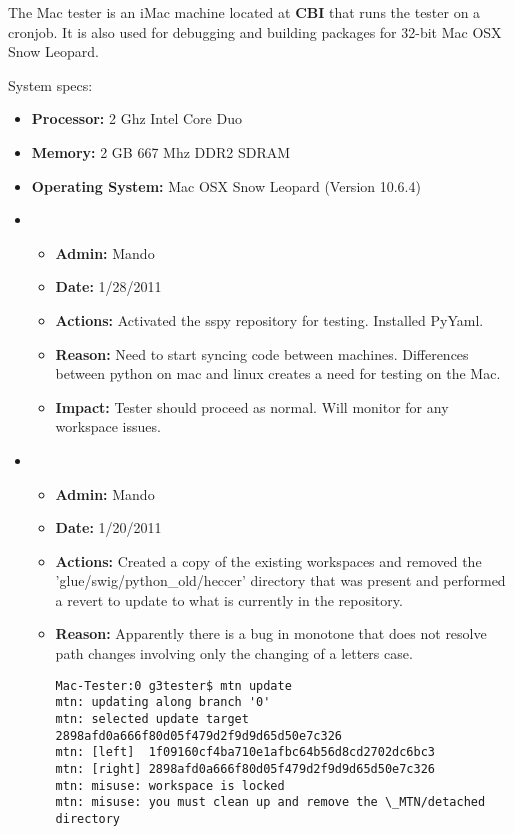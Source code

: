 \documentclass[12pt]{article}
\begin{document}
The Mac tester is an iMac machine located at {\bf CBI} that runs the tester on a cronjob. It is also used for debugging and building packages for 32-bit Mac OSX Snow Leopard.

System specs:
\begin{itemize}
\item[] {\bf Processor:} 2 Ghz Intel Core Duo
\item[] {\bf Memory:} 2 GB 667 Mhz DDR2 SDRAM
\item[] {\bf Operating System:} Mac OSX Snow Leopard (Version 10.6.4) 
\end{itemize}

\begin{itemize}



\item
\begin{itemize}
\item[] {\bf Admin:} Mando
\item[] {\bf Date:} 1/28/2011 
\item[] {\bf Actions:}  Activated the sspy repository for testing. Installed PyYaml.
\item[] {\bf Reason:} Need to start syncing code between machines. Differences between python on mac and linux creates a need for testing on the Mac. 
\item[] {\bf Impact:}  Tester should proceed as normal. Will monitor for any workspace issues.
\end{itemize}

\item 
\begin{itemize}
\item[] {\bf Admin:} Mando
\item[] {\bf Date:} 1/20/2011
\item[] {\bf Actions:} Created a copy of the existing workspaces and removed the 'glue/swig/python\_old/heccer' directory that was present and performed a revert to update to what is currently in the repository.
\item[] {\bf Reason:}  Apparently there is a bug in monotone that does not resolve path changes involving only the changing of a letters case.

\begin{verbatim}
Mac-Tester:0 g3tester$ mtn update
mtn: updating along branch '0'
mtn: selected update target 2898afd0a666f80d05f479d2f9d9d65d50e7c326
mtn: [left]  1f09160cf4ba710e1afbc64b56d8cd2702dc6bc3
mtn: [right] 2898afd0a666f80d05f479d2f9d9d65d50e7c326
mtn: misuse: workspace is locked
mtn: misuse: you must clean up and remove the \_MTN/detached directory
\end{verbatim}


\end{itemize}
\end{itemize}
\end{document}
